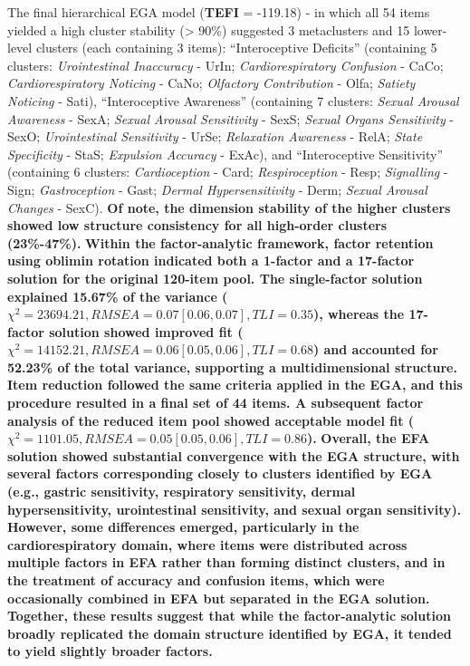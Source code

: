 \documentclass[
  man,
  floatsintext,
  longtable,
  nolmodern,
  notxfonts,
  notimes,
  mask,
  colorlinks=true,linkcolor=blue,citecolor=blue,urlcolor=blue]{apa7}
\begin{document}
The final hierarchical EGA model (\textbf{TEFI} = -119.18) - in which
all 54 items yielded a high cluster stability (\textgreater{} 90\%)
suggested 3 metaclusters and 15 lower-level clusters (each containing 3
items): ``Interoceptive Deficits'' (containing 5 clusters:
\emph{Urointestinal Inaccuracy} - UrIn; \emph{Cardiorespiratory
Confusion} - CaCo; \emph{Cardiorespiratory Noticing} - CaNo;
\emph{Olfactory Contribution} - Olfa; \emph{Satiety Noticing} - Sati),
``Interoceptive Awareness'' (containing 7 clusters: \emph{Sexual Arousal
Awareness} - SexA; \emph{Sexual Arousal Sensitivity} - SexS;
\emph{Sexual Organs Sensitivity} - SexO; \emph{Urointestinal
Sensitivity} - UrSe; \emph{Relaxation Awareness} - RelA; \emph{State
Specificity} - StaS; \emph{Expulsion Accuracy} - ExAc), and
``Interoceptive Sensitivity'' (containing 6 clusters:
\emph{Cardioception} - Card; \emph{Respiroception} - Resp;
\emph{Signalling} - Sign; \emph{Gastroception} - Gast; \emph{Dermal
Hypersensitivity} - Derm; \emph{Sexual Arousal Changes} - SexC).
\textbf{Of note, the dimension stability of the higher clusters showed
low structure consistency for all high-order clusters (23\%-47\%).}
\textbf{Within the factor-analytic framework, factor retention using
oblimin rotation indicated both a 1-factor and a 17-factor solution for
the original 120-item pool. The single-factor solution explained 15.67\%
of the variance
(\(\chi^2 = 23694.21, RMSEA = 0.07 [0.06, 0.07], TLI = 0.35\)), whereas
the 17-factor solution showed improved fit
(\(\chi^2 = 14152.21, RMSEA = 0.06 [0.05, 0.06], TLI = 0.68\)) and
accounted for 52.23\% of the total variance, supporting a
multidimensional structure. Item reduction followed the same criteria
applied in the EGA, and this procedure resulted in a final set of 44
items. A subsequent factor analysis of the reduced item pool showed
acceptable model fit
(\(\chi^2 = 1101.05, RMSEA = 0.05 [0.05, 0.06], TLI = 0.86\)).}
\textbf{Overall, the EFA solution showed substantial convergence with
the EGA structure, with several factors corresponding closely to
clusters identified by EGA (e.g., gastric sensitivity, respiratory
sensitivity, dermal hypersensitivity, urointestinal sensitivity, and
sexual organ sensitivity). However, some differences emerged,
particularly in the cardiorespiratory domain, where items were
distributed across multiple factors in EFA rather than forming distinct
clusters, and in the treatment of accuracy and confusion items, which
were occasionally combined in EFA but separated in the EGA solution.
Together, these results suggest that while the factor-analytic solution
broadly replicated the domain structure identified by EGA, it tended to
yield slightly broader factors.}
\end{document}
